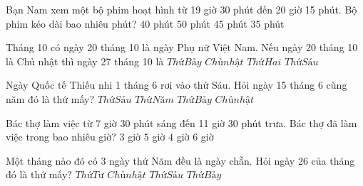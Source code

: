 \begin{ex} %
Bạn Nam xem một bộ phim hoạt hình từ 19 giờ 30 phút đến 20 giờ 15 phút. Bộ phim kéo dài bao nhiêu phút?
\choice
{$40$ phút}
{$50$ phút}
{\True $45$ phút}
{$35$ phút}
\end{ex}

\begin{ex} %
Tháng 10 có ngày 20 tháng 10 là ngày Phụ nữ Việt Nam. Nếu ngày 20 tháng 10 là Chủ nhật thì ngày 27 tháng 10 là
\choice
{$Thứ Bảy$}
{\True $Chủ nhật$}
{$Thứ Hai$}
{$Thứ Sáu$}
\end{ex}

\begin{ex} %
Ngày Quốc tế Thiếu nhi 1 tháng 6 rơi vào thứ Sáu. Hỏi ngày 15 tháng 6 cùng năm đó là thứ mấy?
\choice
{\True $Thứ Sáu$}
{$Thứ Năm$}
{$Thứ Bảy$}
{$Chủ nhật$}
\end{ex}

\begin{ex} %
Bác thợ làm việc từ 7 giờ 30 phút sáng đến 11 giờ 30 phút trưa. Bác thợ đã làm việc trong bao nhiêu giờ?
\choice
{$3$ giờ}
{$5$ giờ}
{\True $4$ giờ}
{$6$ giờ}
\end{ex}

\begin{ex} %
Một tháng nào đó có 3 ngày thứ Năm đều là ngày chẵn. Hỏi ngày 26 của tháng đó là thứ mấy?
\choice
{$Thứ Tư$}
{$Chủ nhật$}
{$Thứ Sáu$}
{\True $Thứ Bảy$}
\end{ex}

